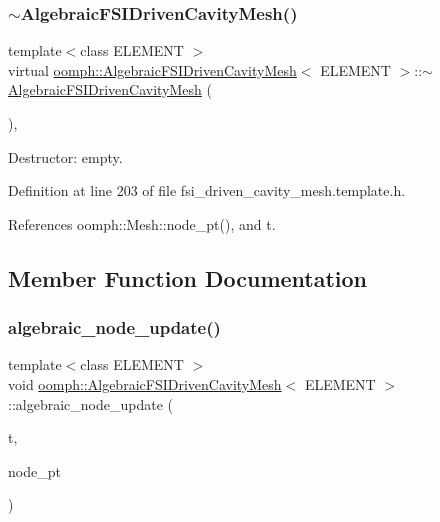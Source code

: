 \subsubsection{\texorpdfstring{$\sim$\+Algebraic\+F\+S\+I\+Driven\+Cavity\+Mesh()}{~AlgebraicFSIDrivenCavityMesh()}}
{\footnotesize\ttfamily template$<$class E\+L\+E\+M\+E\+NT $>$ \\
virtual \hyperlink{classoomph_1_1AlgebraicFSIDrivenCavityMesh}{oomph\+::\+Algebraic\+F\+S\+I\+Driven\+Cavity\+Mesh}$<$ E\+L\+E\+M\+E\+NT $>$\+::$\sim$\hyperlink{classoomph_1_1AlgebraicFSIDrivenCavityMesh}{Algebraic\+F\+S\+I\+Driven\+Cavity\+Mesh} (\begin{DoxyParamCaption}{ }\end{DoxyParamCaption})\hspace{0.3cm}{\ttfamily [inline]}, {\ttfamily [virtual]}}



Destructor\+: empty. 



Definition at line 203 of file fsi\+\_\+driven\+\_\+cavity\+\_\+mesh.\+template.\+h.



References oomph\+::\+Mesh\+::node\+\_\+pt(), and t.



\subsection{Member Function Documentation}
\mbox{\label{classoomph_1_1AlgebraicFSIDrivenCavityMesh_a56c72b78935e84f7fef3f6b5d85556c3}} 
\subsubsection{\texorpdfstring{algebraic\+\_\+node\+\_\+update()}{algebraic\_node\_update()}}
{\footnotesize\ttfamily template$<$class E\+L\+E\+M\+E\+NT $>$ \\
void \hyperlink{classoomph_1_1AlgebraicFSIDrivenCavityMesh}{oomph\+::\+Algebraic\+F\+S\+I\+Driven\+Cavity\+Mesh}$<$ E\+L\+E\+M\+E\+NT $>$\+::algebraic\+\_\+node\+\_\+update (\begin{DoxyParamCaption}\item[{const unsigned \&}]{t,  }\item[{\hyperlink{classoomph_1_1AlgebraicNode}{Algebraic\+Node} $\ast$\&}]{node\+\_\+pt }\end{DoxyParamCaption})\hspace{0.3cm}{\ttfamily [virtual]}}



